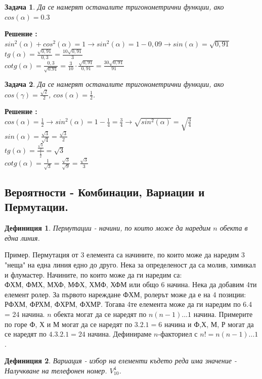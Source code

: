 \documentclass{article}
\newtheorem{definition}{Дефиниция}
\newtheorem{problem}{Задача}
\newcounter{solution}
\newcommand\solution{%
	\stepcounter{solution}%
	\textbf{Решение :}\\%
}
\begin{document}
\begin{problem}
	Да се намерят останалите тригонометрични функции, ако $cos(\alpha) = 0.3 $
\end{problem}
\solution
$sin^2(\alpha) + cos^2(\alpha) = 1 \to sin^2(\alpha) = 1 - 0,09 \to sin(\alpha) = \sqrt{0,91}  $  \\
$tg(\alpha) = \frac{\sqrt{0,91}}{0,3} = \frac{10\sqrt{0,91}}{3} $ \\
 $cotg(\alpha) = \frac{0,3}{\sqrt{0.91}} = \frac{3}{10} \cdot \frac{\sqrt{0,91}}{0,91} = \frac{30\sqrt{0,91}}{91}  $
\begin{problem}
	Да се намерят останалите тригонометрични функции, ако $cos(\gamma) = \frac{\sqrt2}{2} $, $cos(\alpha) = \frac{1}{2} $.
\end{problem}
\solution $cos(\alpha) = \frac{1}{2} \to sin^2(\alpha) = 1 - \frac{1}{4} = \frac{3}{4} \to \sqrt{sin^2(\alpha)} = \sqrt{\frac{3}{4}} $ \\
$ sin(\alpha) = \frac{\sqrt3}{\sqrt4} = \frac{\sqrt3}{2} $ \\
$ tg(\alpha) = \frac{\frac{\sqrt3}{2}}{\frac{1}{2}} = \sqrt{3} $ \\
$cotg(\alpha) = \frac{1}{\sqrt3} = \frac{\sqrt3}{\sqrt9} =  \frac{\sqrt3}{3}$




\subsection{Вероятности - Комбинации, Вариации и Пермутации.}

\begin{definition}
	Пермутации - начини, по които може да наредим $n$ обекта в една линия.
\end{definition}
Пример. Пермутация от 3 елемента са начините, по които може да наредим 3 "неща" на една линия едно до друго. Нека за определеност да са молив, химикал и флумастер. Начините, по които може да ги наредим са: \\
ФХМ, ФМХ, МХФ, МФХ, ХМФ, ХФМ или общо 6 начина. Нека да добавим 4ти елемент ролер. За първото нареждане ФХМ, ролерът може да е на 4 позиции:
РФХМ, ФРХМ, ФХРМ, ФХМР. Тогава 4те елемента може да ги наредим по 6.4 = 24 начина. $n$ обекта могат да се наредят по $n(n-1)...1$ начина. 
Примерите по горе Ф, Х и М могат да се наредят по $3.2.1 =6 $ начина и Ф,Х, М, Р могат да се наредят по $4.3.2.1 = 24$ начина. Дефинираме $n$-факториел с $n! = n(n-1)...1$.


\begin{definition}
Вариация - избор на елементи където реда има значение - Налучкване на телефонен номер. $V_{10}^4$.
\end{definition}
\end{document}
